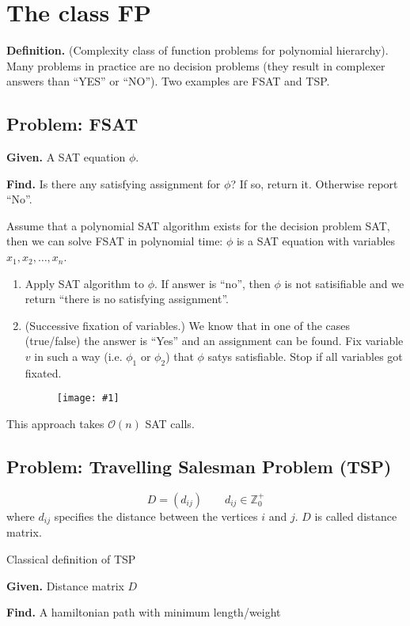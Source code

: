 \documentclass[a4paper]{article}
\newcommand{\drawing}[1]{%
 \begin{figure}[ht]
  \begin{center}
   \texttt{[image: \#1]}
  \end{center}
 \end{figure}
}
\newcommand{\given}[1]{\textbf{Given.} #1\par}
\newcommand{\find}[1]{\textbf{Find.} #1\par}
\newcommand{\cls}[1]{\rm{#1}}
\newenvironment{spec}[0]{\begin{framed}}{\end{framed}}
\begin{document}
\section{The class \cls{FP}}
\label{class:fp}
%
\textbf{Definition.} (Complexity class of function problems for polynomial hierarchy).
Many problems in practice are no decision problems (they result in complexer
answers than ``YES'' or ``NO''). Two examples are FSAT and TSP.

\subsection{Problem: FSAT}
\label{sec:fsat}
%
\begin{spec}
  \given{A SAT equation $\phi$.}
  \find{Is there any satisfying assignment for $\phi$? If so, return it. Otherwise report ``No''.}
\end{spec}

Assume that a polynomial SAT algorithm exists for the decision problem SAT,
then we can solve FSAT in polynomial time:
$\phi$ is a SAT equation with variables $x_1, x_2, \ldots, x_n$.
\begin{enumerate}
  \item Apply SAT algorithm to $\phi$. If answer is ``no'', then
         $\phi$ is not satisifiable and we return ``there is no satisfying
         assignment''.
  \item (Successive fixation of variables.)
         We know that in one of the cases (true/false) the answer is ``Yes''
         and an assignment can be found. Fix variable $v$ in such a way
         (i.e. $\phi_1$ or $\phi_2$) that $\phi$ satys satisfiable.
         Stop if all variables got fixated.
         \drawing{fsat.pdf}
\end{enumerate}

This approach takes $\mathcal{O}(n)$ SAT calls.

\subsection{Problem: Travelling Salesman Problem (TSP)}
\label{sec:tsp}
%
\[
    D = (d_{ij}) \qquad d_{ij} \in \mathbb{Z}_0^+
\]
where $d_{ij}$ specifies the distance between the vertices $i$ and $j$.
$D$ is called distance matrix.

\begin{spec}
  Classical definition of TSP \par
  \given{Distance matrix $D$}
  \find{A hamiltonian path with minimum length/weight}
\end{spec}
\end{document}
